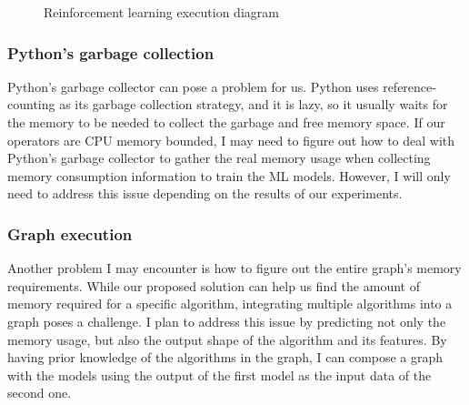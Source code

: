 \begin{figure}[ht]
  \caption{Reinforcement learning execution diagram}
  \label{fig:reinf-learning}
\end{figure}

\subsubsection{Python's garbage collection}

Python's garbage collector can pose a problem for us.
Python uses reference-counting as its garbage collection strategy, and it is lazy, so it usually waits for the memory to be needed to collect the garbage and free memory space.
If our operators are \ac{CPU} memory bounded, I may need to figure out how to deal with Python's garbage collector to gather the real memory usage when collecting memory consumption information to train the ML models.
However, I will only need to address this issue depending on the results of our experiments.

\subsubsection{Graph execution}

Another problem I may encounter is how to figure out the entire graph's memory requirements.
While our proposed solution can help us find the amount of memory required for a specific algorithm, integrating multiple algorithms into a graph poses a challenge.
I plan to address this issue by predicting not only the memory usage, but also the output shape of the algorithm and its features.
By having prior knowledge of the algorithms in the graph, I can compose a graph with the models using the output of the first model as the input data of the second one.
